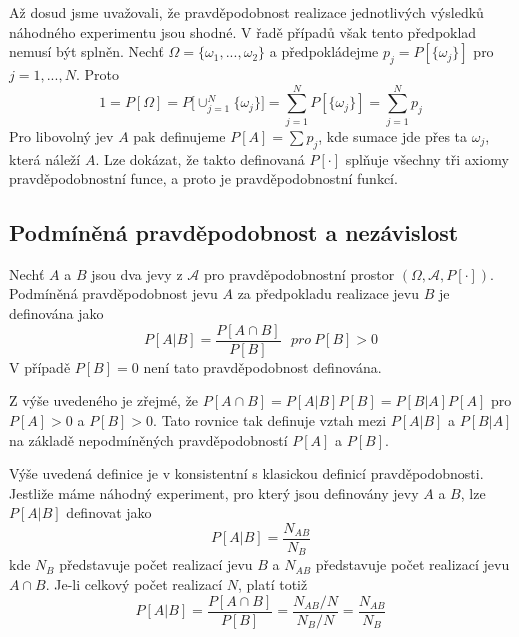 Až dosud jsme uvažovali, že pravděpodobnost realizace jednotlivých výsledků náhodného experimentu jsou shodné. V řadě případů však tento předpoklad nemusí být splněn. Nechť $\Omega = \{\omega_1, ..., \omega_2\}$ a předpokládejme $p_j = P[\{ \omega_j\}]$ pro $j = 1, ..., N$. Proto
\begin{equation*}
1 = P[\Omega] = P \big[\cup_{j=1}^N \{\omega_j \} \big] = \sum_{j = 1}^N P[\{ \omega_j \}] = \sum_{j = 1}^N p_j
\end{equation*}
Pro libovolný jev $A$ pak definujeme $P[A] = \sum p_j$, kde sumace jde přes ta $\omega_j$, která náleží $A$. Lze dokázat, že takto definovaná $P[\cdot]$ splňuje všechny tři axiomy pravděpodobnostní funce, a proto je pravděpodobnostní funkcí.

\subsection{Podmíněná pravděpodobnost a nezávislost}

\begin{definition}
Nechť $A$ a $B$ jsou dva jevy z $\mathscr{A}$ pro pravděpodobnostní prostor $(\Omega, \mathscr{A}, P[\cdot])$. Podmíněná pravděpodobnost jevu $A$ za předpokladu realizace jevu $B$ je definována jako
\begin{equation*}
P[A|B] = \frac{P[A \cap B]}{P[B]}~~~\textit{pro}~P[B] > 0
\end{equation*}
V případě $P[B] = 0$ není tato pravděpodobnost definována. 
\end{definition}
Z výše uvedeného je zřejmé, že $P[A \cap B] = P[A|B]P[B] = P[B|A]P[A]$ pro $P[A] > 0$ a $P[B] > 0$. Tato rovnice tak definuje vztah mezi $P[A|B]$ a $P[B|A]$ na základě nepodmíněných pravděpodobností $P[A]$ a $P[B]$.

Výše uvedená definice je v konsistentní s klasickou definicí pravděpodobnosti. Jestliže máme náhodný experiment, pro který jsou definovány jevy $A$ a $B$, lze $P[A|B]$ definovat jako
\begin{equation*}
P[A|B] = \frac{N_{AB}}{N_B}
\end{equation*}
kde $N_B$ představuje počet realizací jevu $B$ a $N_{AB}$ představuje počet realizací jevu $A \cap B$. Je-li celkový počet realizací $N$, platí totiž
\begin{equation*}
P[A|B] = \frac{P[A \cap B]}{P[B]} = \frac{N_{AB}/N}{N_B/N} = \frac{N_{AB}}{N_B}
\end{equation*}

